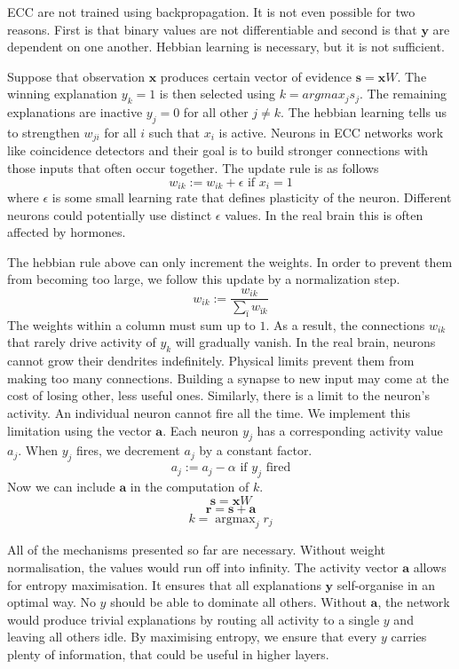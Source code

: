 \documentclass[12pt]{article}
\DeclareMathOperator*{\argmax}{argmax}
\begin{document}
ECC are not trained using backpropagation. It is not even possible for two reasons. First is that binary values are not differentiable and second is that $\boldsymbol{y}$ are dependent on one another. Hebbian learning is necessary, but it is not sufficient. 

Suppose that observation $\boldsymbol{x}$ produces certain vector of evidence $\boldsymbol{s}=\boldsymbol{x}W$. The winning explanation $y_k=1$ is then selected using $k=argmax_j s_j$. The remaining explanations are inactive $y_j=0$ for all other $j\ne k$.
The hebbian learning tells us to strengthen $w_{ji}$ for all $i$ such that $x_i$ is active. Neurons in ECC networks work like coincidence detectors and their goal is to build stronger connections with those inputs that often occur together. The update rule is as follows
\[
w_{ik} := w_{ik} + \epsilon \text{ if } x_i=1
\]
where $\epsilon$ is some small learning rate that defines plasticity of the neuron. Different neurons could potentially use distinct $\epsilon$ values. In the real brain this is often affected by hormones. 

The hebbian rule above can only increment the weights. In order to prevent them from becoming too large, we follow this update by a normalization step.
\[
w_{ik} := \frac{w_{ik}}{ \sum_{ï} w_{ïk}} 
\]
The weights within a column must sum up to $1$. As a result, the connections $w_{ik}$ that rarely drive activity of $y_k$ will gradually vanish. In the real brain, neurons cannot grow their dendrites indefinitely. Physical limits prevent them from making too many connections. Building a synapse to new input may come at the cost of losing other, less useful ones. Similarly, there is a limit to the neuron's activity. An individual neuron cannot fire all the time. We implement this limitation using the vector $\boldsymbol{a}$. Each neuron $y_j$ has a corresponding activity value $a_j$.
When $y_j$ fires, we decrement $a_j$ by a constant factor.
\[
a_j := a_j - \alpha \text{ if } y_j \text{ fired}
\]
Now we can include $\boldsymbol{a}$ in the computation of $k$.
\[\boldsymbol{s} = \boldsymbol{x}W \]
\[\boldsymbol{r} = \boldsymbol{s} + \boldsymbol{a} \]
\[k = \argmax_j r_j \]

All of the mechanisms presented so far are necessary. Without weight normalisation, the values would run off into infinity. The activity vector $\boldsymbol{a}$ allows for entropy maximisation. It ensures that all explanations
$\boldsymbol{y}$ self-organise in an optimal way. No $y$ should be able to dominate all others. Without $\boldsymbol{a}$, the network would produce trivial explanations by routing all activity to a single $y$ and leaving all others idle. By maximising entropy, we ensure that every $y$ carries plenty of information, that could be useful in higher layers.
\end{document}
